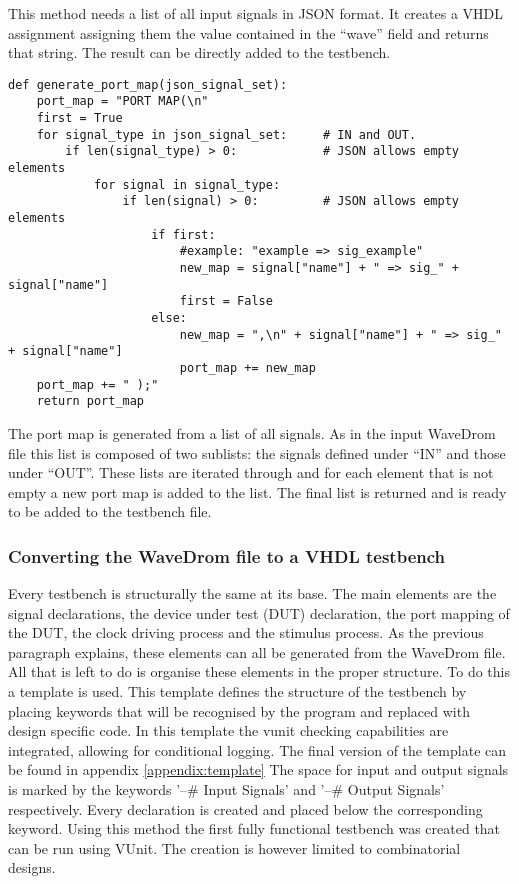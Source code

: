 This method needs a list of all input signals in JSON format. It creates a VHDL assignment assigning them the value contained in the “wave” field and returns that string. The result can be directly added to the testbench.\newpage
\begin{lstlisting}[style=python, caption={Generating a port map in Python}, label={
python:port_map}]
def generate_port_map(json_signal_set):
	port_map = "PORT MAP(\n"
	first = True
	for signal_type in json_signal_set:     # IN and OUT.
		if len(signal_type) > 0:            # JSON allows empty elements
			for signal in signal_type:
				if len(signal) > 0:         # JSON allows empty elements
					if first:
						#example: "example => sig_example"
						new_map = signal["name"] + " => sig_" + signal["name"]
						first = False
					else:
						new_map = ",\n" + signal["name"] + " => sig_" + signal["name"]
						port_map += new_map
	port_map += " );"
	return port_map
\end{lstlisting}\nline
The port map is generated from a list of all signals. As in the input WaveDrom file this list is composed of two sublists: the signals defined under “IN” and those under “OUT”. These lists are iterated through and for each element that is not empty a new port map is added to the list. The final list is returned and is ready to be added to the testbench file.
\subsubsection{Converting the WaveDrom file to a VHDL testbench}
Every testbench is structurally the same at its base. The main elements are the signal declarations, the device under test (DUT) declaration, the port mapping of the DUT, the clock driving process and the stimulus process. As the previous paragraph explains, these elements can all be generated from the WaveDrom file. All that is left to do is organise these elements in the proper structure. To do this a template is used. This template defines the structure of the testbench by placing keywords that will be recognised by the program and replaced with design specific code. In this template the vunit checking capabilities are integrated, allowing for conditional logging. The final version of the template can be found in appendix \ref{appendix:template}
\npar
The space for input and output signals is marked by the keywords '--\# Input Signals' and '--\# Output Signals' respectively. Every declaration is created and placed below the corresponding keyword. 
\npar
Using this method the first fully functional testbench was created that can be run using VUnit. The creation is however limited to combinatorial designs.
